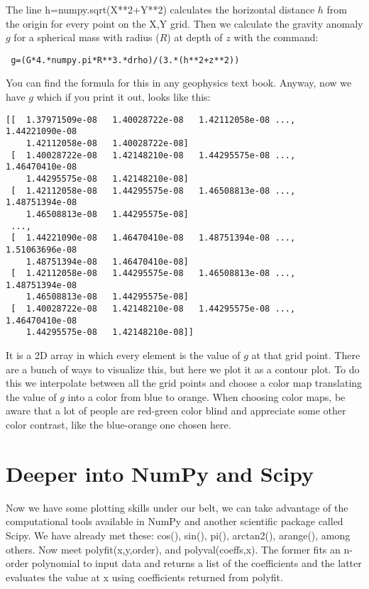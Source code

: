 {The line {\color{blue}h=numpy.sqrt(X**2+Y**2)} calculates the horizontal distance $h$ from the origin for every point on the  {\color{blue}X,Y} grid.   Then we calculate the gravity anomaly $g$ for a spherical mass with radius ($R$) at depth of $z$ with the command:

 {\color{blue}\begin{verbatim}
 g=(G*4.*numpy.pi*R**3.*drho)/(3.*(h**2+z**2))
 \end{verbatim}}
 
\noindent You can find the formula for this in any geophysics text book.  Anyway, now we have $g$ which if you print it out, looks like this:

{\singlespacing \color{blue}\begin{verbatim}
[[  1.37971509e-08   1.40028722e-08   1.42112058e-08 ...,   1.44221090e-08
    1.42112058e-08   1.40028722e-08]
 [  1.40028722e-08   1.42148210e-08   1.44295575e-08 ...,   1.46470410e-08
    1.44295575e-08   1.42148210e-08]
 [  1.42112058e-08   1.44295575e-08   1.46508813e-08 ...,   1.48751394e-08
    1.46508813e-08   1.44295575e-08]
 ..., 
 [  1.44221090e-08   1.46470410e-08   1.48751394e-08 ...,   1.51063696e-08
    1.48751394e-08   1.46470410e-08]
 [  1.42112058e-08   1.44295575e-08   1.46508813e-08 ...,   1.48751394e-08
    1.46508813e-08   1.44295575e-08]
 [  1.40028722e-08   1.42148210e-08   1.44295575e-08 ...,   1.46470410e-08
    1.44295575e-08   1.42148210e-08]]
\end{verbatim}}

\noindent
It is a 2D array in which every element is the value of $g$ at that grid point.  There are a bunch of ways to visualize this, but here we plot it as a contour plot.  To do this we interpolate between all the grid points and choose a color map translating the value of $g$ into a color from blue to orange.  When choosing color maps, be aware that a lot of people are red-green color blind and appreciate some other color contrast, like the  blue-orange one chosen here.






\section{Deeper into NumPy and Scipy}

Now we have some plotting skills under our belt, we can take advantage of the computational tools available in {\color{blue}NumPy} and another scientific package called {\color{blue}Scipy}.  
We have already met these: cos(), sin(), pi(), arctan2(), arange(), among others.  
 Now meet {\color{blue}polyfit(x,y,order)}, and {\color{blue}polyval(coeffs,x)}. The former fits an n-order polynomial to input data and returns a list of the coefficients and the latter evaluates the value at x using coefficients returned from polyfit.  
 
}
